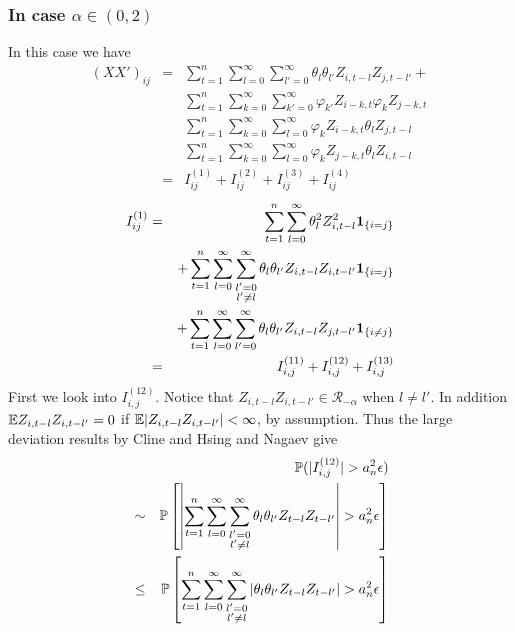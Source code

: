 \documentclass{article}
\begin{document}
\subsubsection[alpha in (0,2)]{In case $\alpha \in (0,2)$}
In this case we have
\begin{eqnarray*}
  (XX')_{ij} &=& \sum_{t=1}^n \sum_{l=0}^\infty \sum_{l'=0}^\infty
  \theta_l\theta_{l'} Z_{i,t-l} Z_{j,t-l'} + \\
  && \sum_{t=1}^n \sum_{k=0}^\infty \sum_{k'=0}^\infty \varphi_{k'}
  Z_{i-k,t} \varphi_k Z_{j-k,t} \\
  && \sum_{t=1}^n \sum_{k=0}^\infty \sum_{l=0}^\infty \varphi_k
  Z_{i-k,t} \theta_l Z_{j,t-l} \\
  && \sum_{t=1}^n \sum_{k=0}^\infty \sum_{l=0}^\infty \varphi_k
  Z_{j-k,t} \theta_l Z_{i,t-l} \\
  &=& I^{(1)}_{ij} + I^{(2)}_{ij} + I^{(3)}_{ij} + I^{(4)}_{ij}
\end{eqnarray*}
\begin{eqnarray*}
  I^{(1)}_{ij} &=& \sum_{t=1}^n \sum_{l=0}^\infty \theta_{l}^2
  Z_{i,t-l}^2 \mathbf{1}_{\{i=j\}}\\
  && + \sum_{t=1}^n \sum_{l=0}^\infty \sum_{\substack{l'=0 \\l'\neq
      l}}^\infty \theta_l\theta_{l'} Z_{i,t-l} Z_{i,t-l'} \mathbf{1}_{\{i=j\}} \\
  && + \sum_{t=1}^n \sum_{l=0}^\infty \sum_{l'=0}^\infty
  \theta_l\theta_{l'} Z_{i,t-l} Z_{j,t-l'} \mathbf{1}_{\{i\neq j\}} \\
  &=& I^{(11)}_{i,j} + I^{(12)}_{i,j} + I^{(13)}_{i,j} \\
\end{eqnarray*}
First we look into $I^{(12)}_{i,j}$. Notice that $Z_{i,t-l}
Z_{i,t-l'} \in \mathcal R_{-\alpha}$ when $l \neq l'$. In addition $\mathbb{E}
Z_{i,t-l} Z_{i,t-l'} = 0$ if $\mathbb{E}|Z_{i,t-l} Z_{i,t-l'}| < \infty$, by
assumption. Thus the large deviation results by Cline and Hsing
\cite{ClingHsing1998} and Nagaev \cite{nagaev1979} give
\begin{eqnarray*}
  && \mathbb{P}(|I^{(12)}_{i,j}| > a_n^2 \epsilon) \\
  &\sim& \mathbb{P}\left[\left|
    \sum_{t=1}^n \sum_{l=0}^\infty \sum_{\substack{l'=0 \\l'\neq
        l}}^\infty \theta_l\theta_{l'} Z_{t-l} Z_{t-l'} \right|
    > a_n^2 \epsilon\right] \\
  &\leq& \mathbb{P}\left[
    \sum_{t=1}^n \sum_{l=0}^\infty \sum_{\substack{l'=0 \\l'\neq
        l}}^\infty \left|\theta_l\theta_{l'} Z_{t-l} Z_{t-l'} \right|
    > a_n^2 \epsilon\right]
\end{eqnarray*}
\end{document}
